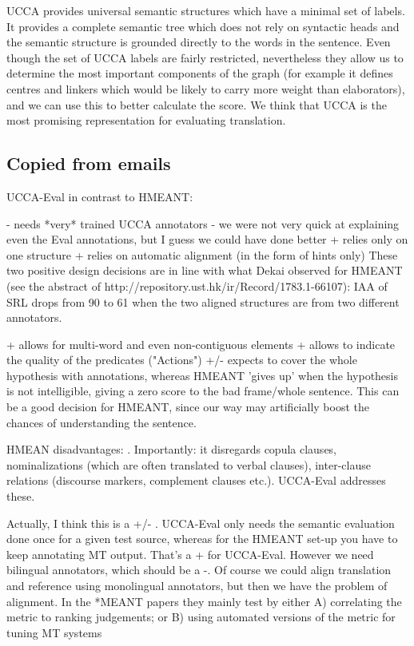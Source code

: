 \documentclass[11pt]{article}
\begin{document}
UCCA provides universal semantic structures which 
have
a minimal set of labels. It provides a complete semantic tree which does not rely on syntactic heads and the semantic structure is grounded directly to the words in the sentence. 
 Even though the set of UCCA labels are fairly restricted,  nevertheless they allow us to determine the most important components of the graph (for example it defines centres and linkers which would be likely to carry more weight than elaborators), and we can use this to better calculate the score. 
We think that UCCA is the
most promising representation for evaluating translation. 

\subsection{Copied from emails}


UCCA-Eval in contrast to HMEANT:

- needs *very* trained UCCA annotators
- we were not very quick at explaining even the Eval annotations, but I guess we could have done better
+ relies only on one structure
+ relies on automatic alignment (in the form of hints only)
  These two positive design decisions are in line with what Dekai observed for HMEANT (see the abstract of http://repository.ust.hk/ir/Record/1783.1-66107): IAA of SRL drops from 90 to 61 when the two aligned structures are from two different annotators.

+ allows for multi-word and even non-contiguous elements
+ allows to indicate the quality of the predicates ("Actions")
+/- expects to cover the whole hypothesis with annotations, whereas HMEANT 'gives up' when the hypothesis is not intelligible, giving a zero score to the bad frame/whole sentence. This can be a good decision for HMEANT, since our way may artificially boost the chances of understanding the sentence.


HMEAN disadvantages:
. Importantly: it disregards copula clauses, nominalizations (which are often translated to verbal clauses), inter-clause relations (discourse markers, complement clauses etc.). UCCA-Eval addresses these.

Actually, I think this is a +/- . UCCA-Eval only needs the semantic evaluation done once for a given test source, whereas for the HMEANT set-up you have to keep annotating MT output. That's a + for UCCA-Eval. However we need bilingual annotators, which should be a -. Of course we could align translation and reference using monolingual annotators, but then we have the problem of alignment.
In the *MEANT papers they mainly test by either
A) correlating the metric to ranking judgements; or
B) using automated versions of the metric for tuning MT systems
\end{document}
